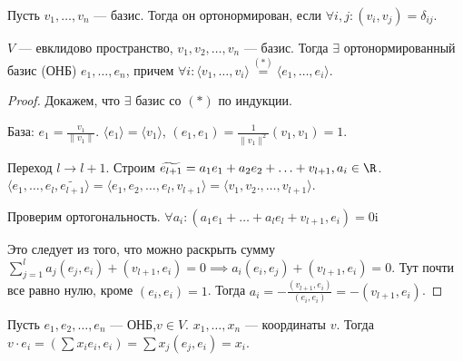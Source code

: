 \begin{definition}
    Пусть $v_1, \ldots, v_n$ --- базис. Тогда он ортонормирован, если $\forall i,j\!: (v_i, v_j) = \delta_{ij}$.
\end{definition}
\begin{theorem}
    $V$ --- евклидово пространство,  $v_1, v_2, \ldots, v_n$ --- базис.
    Тогда $\exists$ ортонормированный базис (ОНБ)  $e_1, \ldots, e_n$, причем $\forall i\!: \langle v_1, \ldots, v_i\rangle \overset{(*)}{=} \langle e_1, \ldots, e_i\rangle$.
\end{theorem}
\begin{proof}
    Докажем, что $\exists$ базис со  $(*)$ по индукции.

    База: $e_1 = \frac{v_1}{\|v_1\|}$. $\langle e_1\rangle = \langle v_1\rangle$, $(e_1, e_1) = \frac{1}{\|v_1\|^2} (v_1, v_1) = 1$.

    Переход $l \to l+1$.  Строим  $\widetilde{e_{l+1}} = a_1e_1 + a_2e_2 + \ldots + v_{l+1}, a_i \in \R$. $\langle e_1, \ldots, e_l, \widetilde{e_{l+1}} \rangle = \langle e_1, e_2, \ldots, e_l, v_{l+1} \rangle = \langle v_1, v_2., \ldots, v_{l+1}\rangle$.

    Проверим ортогональность. $\forall a_i\!: (a_1e_1 + \ldots + a_le_l + v_{l+1}, e_i) = 0$i

    Это следует из того, что можно раскрыть сумму $\sum\limits_{j=1}^l a_j(e_j, e_i) + (v_{l+1}, e_i) = 0 \implies a_i(e_i, e_j) + (v_{l+1}, e_i) = 0$. Тут почти все равно нулю, кроме  $(e_i, e_i) = 1$. Тогда  $a_i = - \frac{(v_{l+1}, e_i)}{(e_i, e_i)} = -(v_{l+1}, e_i)$.
\end{proof}
\begin{remark}
    Пусть $e_1, e_2, \ldots, e_n$ --- ОНБ,$v \in V$.  $x_1, \ldots, x_n$ --- координаты $v$. Тогда  $v\cdot e_i = (\sum x_i e_i, e_i) = \sum x_j(e_j, e_i) = x_i$.
\end{remark}

